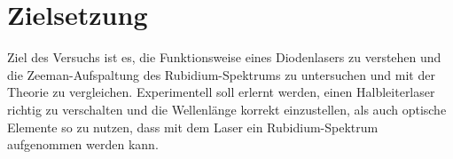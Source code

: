 \section{Zielsetzung}
Ziel des Versuchs ist es, die Funktionsweise eines Diodenlasers zu verstehen und die Zeeman-Aufspaltung des Rubidium-Spektrums zu untersuchen
und mit der Theorie zu vergleichen. Experimentell soll erlernt werden, einen Halbleiterlaser richtig zu verschalten und die Wellenlänge korrekt einzustellen, 
als auch optische Elemente so zu nutzen, dass mit dem Laser ein Rubidium-Spektrum aufgenommen werden kann.